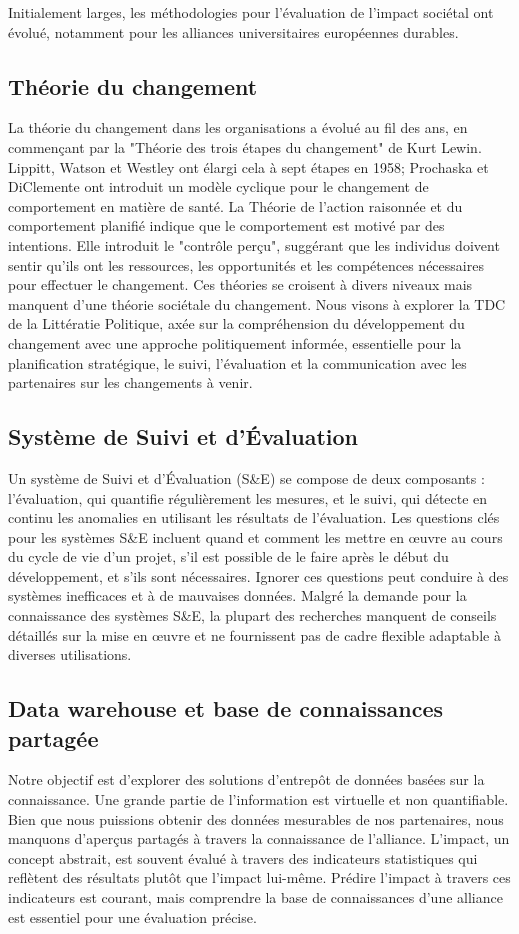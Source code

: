 Initialement larges, les méthodologies pour l'évaluation de l'impact sociétal ont évolué, notamment pour les alliances universitaires européennes durables.

\subsection{Théorie du changement}
La théorie du changement dans les organisations a évolué au fil des ans, en commençant par la "Théorie des trois étapes du changement" de Kurt Lewin. Lippitt, Watson et Westley ont élargi cela à sept étapes en 1958; Prochaska et DiClemente ont introduit un modèle cyclique pour le changement de comportement en matière de santé. La Théorie de l’action raisonnée et du comportement planifié indique que le comportement est motivé par des intentions. Elle introduit le "contrôle perçu", suggérant que les individus doivent sentir qu'ils ont les ressources, les opportunités et les compétences nécessaires pour effectuer le changement. Ces théories se croisent à divers niveaux mais manquent d'une théorie sociétale du changement. Nous visons à explorer la TDC de la Littératie Politique, axée sur la compréhension du développement du changement avec une approche politiquement informée, essentielle pour la planification stratégique, le suivi, l'évaluation et la communication avec les partenaires sur les changements à venir.

\subsection{Système de Suivi et d'Évaluation }
Un système de Suivi et d'Évaluation (S\&E) se compose de deux composants : l'évaluation, qui quantifie régulièrement les mesures, et le suivi, qui détecte en continu les anomalies en utilisant les résultats de l'évaluation. Les questions clés pour les systèmes S\&E incluent quand et comment les mettre en œuvre au cours du cycle de vie d'un projet, s'il est possible de le faire après le début du développement, et s'ils sont nécessaires. Ignorer ces questions peut conduire à des systèmes inefficaces et à de mauvaises données. Malgré la demande pour la connaissance des systèmes S\&E, la plupart des recherches manquent de conseils détaillés sur la mise en œuvre et ne fournissent pas de cadre flexible adaptable à diverses utilisations.

\subsection{Data warehouse et base de connaissances partagée}
Notre objectif est d'explorer des solutions d'entrepôt de données basées sur la connaissance. Une grande partie de l'information est virtuelle et non quantifiable. Bien que nous puissions obtenir des données mesurables de nos partenaires, nous manquons d'aperçus partagés à travers la connaissance de l'alliance. L'impact, un concept abstrait, est souvent évalué à travers des indicateurs statistiques qui reflètent des résultats plutôt que l'impact lui-même. Prédire l'impact à travers ces indicateurs est courant, mais comprendre la base de connaissances d'une alliance est essentiel pour une évaluation précise. 